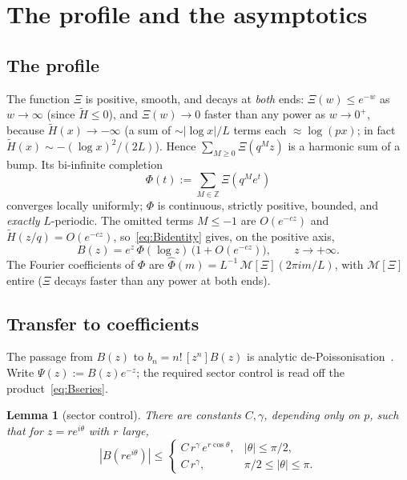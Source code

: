 \documentclass[11pt]{article}
\newtheorem{lemma}[theorem]{Lemma}
\theoremstyle{definition}
\newcommand{\Z}{\mathbb{Z}}
\newcommand{\Mellin}{\mathcal{M}}
\begin{document}
\section{The profile and the asymptotics}\label{sec:asymp}

\subsection{The profile}

The function $\Xi$ is positive, smooth, and decays at \emph{both}
ends: $\Xi(w)\le e^{-w}$ as $w\to\infty$ (since $\tilde H\le0$), and
$\Xi(w)\to0$ faster than any power as $w\to0^+$, because
$\tilde H(x)\to-\infty$ (a sum of $\sim|\log x|/L$ terms each
$\approx\log(px)$; in fact $\tilde H(x)\sim-(\log x)^2/(2L)$). Hence
$\sum_{M\ge0}\Xi(q^Mz)$ is a harmonic sum of a bump. Its bi-infinite
completion
\begin{equation}\label{eq:Phidef}
  \Phi(t):=\sum_{M\in\Z}\Xi(q^Me^{t})
\end{equation}
converges locally uniformly; $\Phi$ is continuous, strictly positive,
bounded, and \emph{exactly} $L$-periodic. The omitted terms $M\le-1$
are $O(e^{-cz})$ and $\tilde H(z/q)=O(e^{-cz})$,
so~\eqref{eq:Bidentity} gives, on the positive axis,
\begin{equation}\label{eq:Basymp}
  B(z)=e^{z}\,\Phi(\log z)\,\bigl(1+O(e^{-cz})\bigr),
  \qquad z\to+\infty .
\end{equation}
The Fourier coefficients of $\Phi$ are $\widehat\Phi(m)=
L^{-1}\,\Mellin[\Xi](2\pi i m/L)$, with $\Mellin[\Xi]$ entire ($\Xi$
decays faster than any power at both ends).

\subsection{Transfer to coefficients}\label{sec:transfer}

The passage from $B(z)$ to $b_n=n!\,[z^n]B(z)$ is analytic
de-Poissonisation~\cite{JS}. Write $\Psi(z):=B(z)e^{-z}$; the required
sector control is read off the product~\eqref{eq:Bseries}.

\begin{lemma}[sector control]\label{lem:sector}
  There are constants $C,\gamma$, depending only on $p$, such that for
  $z=re^{i\theta}$ with $r$ large,
  \[
    |B(re^{i\theta})|\le
      \begin{cases}
        C\,r^{\gamma}\,e^{r\cos\theta}, & |\theta|\le\pi/2,\\[2pt]
        C\,r^{\gamma}, & \pi/2\le|\theta|\le\pi .
      \end{cases}
  \]
\end{lemma}
\end{document}

